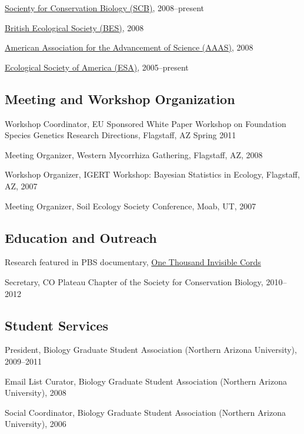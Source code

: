 \documentclass[letterpaper]{article}
\renewenvironment{itemize}{
  \begin{list}{}{
    \setlength{\leftmargin}{1em}
  }
}{
  \end{list}
}
\begin{document}
\begin{itemize}
\item \href{http://www.conbio.org/}{Socienty for Conservation Biology (SCB)}, 2008--present
\item \href{http://www.aaas.org/}{British Ecological Society (BES)}, 2008
\item \href{http://www.aaas.org/}{American Association for the Advancement of Science (AAAS)}, 2008
\item \href{http://www.esa.org/}{Ecological Society of America (ESA)}, 2005--present
\end{itemize}

\subsection{Meeting and Workshop Organization}
\begin{itemize}
\item Workshop Coordinator, EU Sponsored White Paper Workshop on Foundation Species Genetics Research Directions, Flagstaff, AZ Spring 2011
\item Meeting Organizer, Western Mycorrhiza Gathering, Flagstaff, AZ, 2008
\item Workshop Organizer, IGERT Workshop: Bayesian Statistics in Ecology, Flagstaff, AZ, 2007
\item Meeting Organizer, Soil Ecology Society Conference, Moab, UT, 2007
\end{itemize}

\subsection{Education and Outreach}
\begin{itemize}
\item Research featured in PBS documentary, \href{http://nau.edu/Research/Feature-Stories/A-Thousand-Invisible-Cords/}{One Thousand Invisible Cords}
\item Secretary, CO Plateau Chapter of the Society for Conservation Biology, 2010--2012
\end{itemize}

\subsection{Student Services}
\begin{itemize}
\item President, Biology Graduate Student Association (Northern Arizona University), 2009--2011
\item Email List Curator, Biology Graduate Student Association (Northern Arizona University), 2008
\item Social Coordinator, Biology Graduate Student Association (Northern Arizona University), 2006
\end{itemize}
\end{document}
